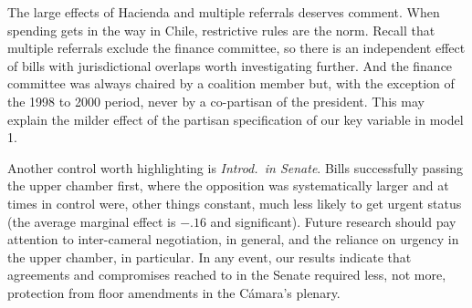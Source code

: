 \documentclass[letter,12pt]{article}
\begin{document}
The large effects of Hacienda and multiple referrals deserves comment. When spending gets in the way in Chile, restrictive rules are the norm. Recall that multiple referrals exclude the finance committee, so there is an independent effect of bills with jurisdictional overlaps worth investigating further. And the finance committee was always chaired by a coalition member but, with the exception of the 1998 to 2000 period, never by a co-partisan of the president. This may explain the milder effect of the partisan specification of our key variable in model 1. 




Another control worth highlighting is \emph{Introd.\ in Senate}. Bills successfully passing the upper chamber first, where the opposition was systematically larger and at times in control were, other things constant, much less likely to get urgent status (the average marginal effect is $-.16$ and significant). Future research should pay attention to inter-cameral negotiation, in general, and the reliance on urgency in the upper chamber, in particular. In any event, our results indicate that agreements and compromises reached to in the Senate required less, not more, protection from floor amendments in the Cámara's plenary. 
\end{document}
